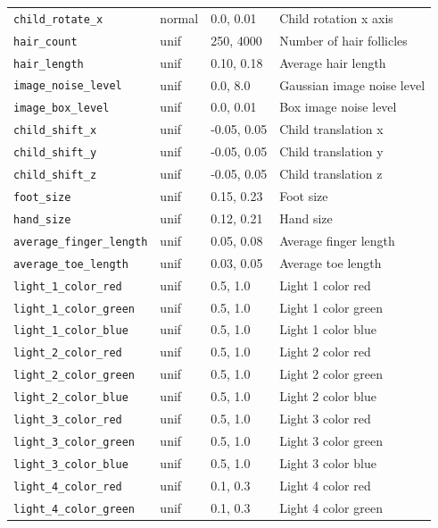 \documentclass{article}
\begin{document}
\begin{table}[h]
{\begin{tabular}{|l|l|l|l|}
    \texttt{child\_rotate\_x} & normal & 0.0, 0.01 & Child rotation x axis \\ 
    \texttt{hair\_count} & unif & 250, 4000 & Number of hair follicles \\
    \texttt{hair\_length} & unif & 0.10, 0.18 & Average hair length \\ 
    \texttt{image\_noise\_level} & unif & 0.0, 8.0 & Gaussian image noise level\\ 
    \texttt{image\_box\_level} & unif & 0.0, 0.01 & Box image noise level \\
    \texttt{child\_shift\_x} & unif & -0.05, 0.05 & Child translation x\\
    \texttt{child\_shift\_y} & unif & -0.05, 0.05 & Child translation y\\
    \texttt{child\_shift\_z} & unif & -0.05, 0.05 & Child translation z\\
    \texttt{foot\_size} & unif & 0.15, 0.23 & Foot size\\
    \texttt{hand\_size} & unif & 0.12, 0.21 & Hand size\\
    \texttt{average\_finger\_length} & unif & 0.05, 0.08 & Average finger length\\
    \texttt{average\_toe\_length} & unif & 0.03, 0.05 & Average toe length\\
    \texttt{light\_1\_color\_red} & unif & 0.5, 1.0 & Light 1 color red\\
    \texttt{light\_1\_color\_green} & unif & 0.5, 1.0 & Light 1 color green\\
    \texttt{light\_1\_color\_blue} & unif & 0.5, 1.0 & Light 1 color blue\\
    \texttt{light\_2\_color\_red} & unif & 0.5, 1.0 & Light 2 color red\\
    \texttt{light\_2\_color\_green} & unif & 0.5, 1.0 & Light 2 color green\\
    \texttt{light\_2\_color\_blue} & unif & 0.5, 1.0 & Light 2 color blue\\
    \texttt{light\_3\_color\_red} & unif & 0.5, 1.0 & Light 3 color red\\
    \texttt{light\_3\_color\_green} & unif & 0.5, 1.0 & Light 3 color green\\
    \texttt{light\_3\_color\_blue} & unif & 0.5, 1.0 & Light 3 color blue\\
    \texttt{light\_4\_color\_red} & unif & 0.1, 0.3 & Light 4 color red\\
    \texttt{light\_4\_color\_green} & unif & 0.1, 0.3 & Light 4 color green\\

\end{tabular}}
\end{table}
\end{document}
